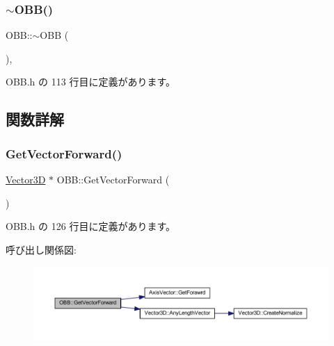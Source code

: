 \mbox{\label{class_o_b_b_aa95ab77e0c88faf68db43ed7f6b0ea5a}} 
\subsubsection{\texorpdfstring{$\sim$\+O\+B\+B()}{~OBB()}}
{\footnotesize\ttfamily O\+B\+B\+::$\sim$\+O\+BB (\begin{DoxyParamCaption}{ }\end{DoxyParamCaption})\hspace{0.3cm}{\ttfamily [inline]}, {\ttfamily [virtual]}}



 O\+B\+B.\+h の 113 行目に定義があります。



\subsection{関数詳解}
\mbox{\label{class_o_b_b_a03fdc91609b94007369d3ba168dbb54d}} 
\subsubsection{\texorpdfstring{Get\+Vector\+Forward()}{GetVectorForward()}}
{\footnotesize\ttfamily \mbox{\hyperlink{class_vector3_d}{Vector3D}} $\ast$ O\+B\+B\+::\+Get\+Vector\+Forward (\begin{DoxyParamCaption}{ }\end{DoxyParamCaption})\hspace{0.3cm}{\ttfamily [inline]}}



 O\+B\+B.\+h の 126 行目に定義があります。

呼び出し関係図\+:\nopagebreak
\begin{figure}[H]
\begin{center}
\leavevmode
\includegraphics[width=350pt]{class_o_b_b_a03fdc91609b94007369d3ba168dbb54d_cgraph}
\end{center}
\end{figure}
\mbox{\label{class_o_b_b_a03218b64dad1985876e7bad09f4a61ce}} 

